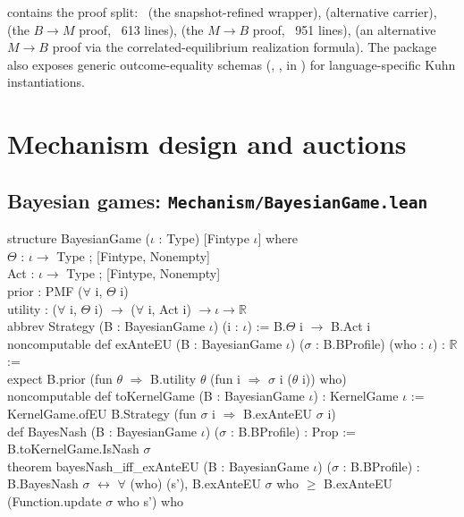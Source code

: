 \Variants
{} contains the proof split:\
 (the snapshot-refined wrapper),
 (alternative carrier),
(the $B \to M$ proof, ~613 lines),
 (the $M \to B$ proof, ~951 lines),
\TT{CorrelatedRealization.lean} (an alternative
$M \to B$ proof via the correlated-equilibrium realization formula).
The package also exposes generic outcome-equality schemas
(,
,
 in ) for
language-specific Kuhn instantiations.

\section{Mechanism design and auctions}
\label{sec:supp:mechanism}

\subsection{Bayesian games: \texttt{Mechanism/BayesianGame.lean}}
\label{sec:supp:bayesian}\label{def:BayesianGame}\label{def:BayesianGame.toKernelGame}

\begin{leanbox}
structure BayesianGame ($\iota$ : Type) [Fintype $\iota$] where\\
\bd $\Theta$       : $\iota \to$ Type ; [Fintype, Nonempty]\\
\bd Act     : $\iota \to$ Type ; [Fintype, Nonempty]\\
\bd prior   : PMF ($\forall$ i, $\Theta$ i)\\
\bd utility : ($\forall$ i, $\Theta$ i) $\to$ ($\forall$ i, Act i) $\to \iota \to \mathbb{R}$\\[3pt]
abbrev Strategy (B : BayesianGame $\iota$) (i : $\iota$) := B.$\Theta$ i $\to$ B.Act i\\[3pt]
noncomputable def exAnteEU (B : BayesianGame $\iota$) ($\sigma$ : B.BProfile) (who : $\iota$) : $\mathbb{R}$ :=\\
\bd expect B.prior (fun $\theta$ $\Rightarrow$ B.utility $\theta$ (fun i $\Rightarrow$ $\sigma$ i ($\theta$ i)) who)\\[3pt]
noncomputable def toKernelGame (B : BayesianGame $\iota$) : KernelGame $\iota$ :=\\
\bd KernelGame.ofEU B.Strategy (fun $\sigma$ i $\Rightarrow$ B.exAnteEU $\sigma$ i)\\[3pt]
def BayesNash (B : BayesianGame $\iota$) ($\sigma$ : B.BProfile) : Prop :=\\
\bd B.toKernelGame.IsNash $\sigma$\\[3pt]
theorem bayesNash\_iff\_exAnteEU (B : BayesianGame $\iota$) ($\sigma$ : B.BProfile) :\\
\bd B.BayesNash $\sigma$ $\leftrightarrow$ $\forall$ (who) (s'), B.exAnteEU $\sigma$ who $\ge$ B.exAnteEU (Function.update $\sigma$ who s') who
\end{leanbox}

